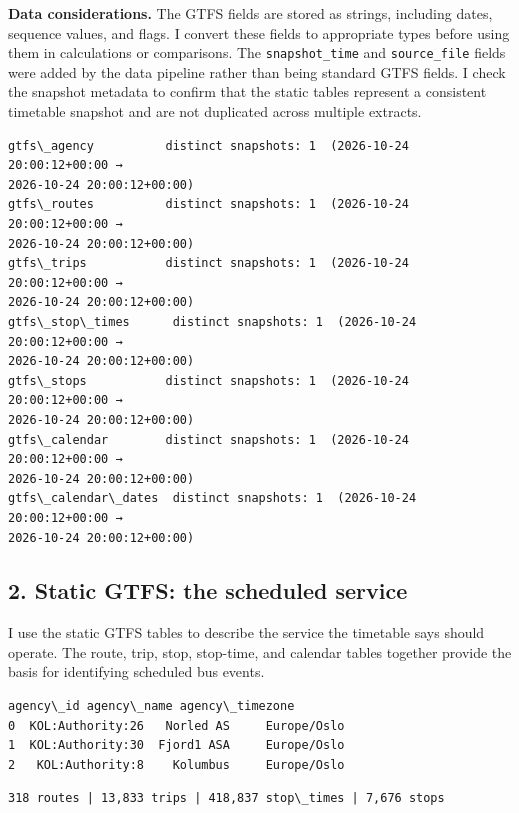\documentclass[11pt]{article}
\begin{document}
    \textbf{Data considerations.} The GTFS fields are stored as strings,
including dates, sequence values, and flags. I convert these fields to
appropriate types before using them in calculations or comparisons. The
\texttt{snapshot\_time} and \texttt{source\_file} fields were added by
the data pipeline rather than being standard GTFS fields. I check the
snapshot metadata to confirm that the static tables represent a
consistent timetable snapshot and are not duplicated across multiple
extracts.

    \begin{Verbatim}[commandchars=\\\{\}]
gtfs\_agency          distinct snapshots: 1  (2026-10-24 20:00:12+00:00 →
2026-10-24 20:00:12+00:00)
gtfs\_routes          distinct snapshots: 1  (2026-10-24 20:00:12+00:00 →
2026-10-24 20:00:12+00:00)
gtfs\_trips           distinct snapshots: 1  (2026-10-24 20:00:12+00:00 →
2026-10-24 20:00:12+00:00)
gtfs\_stop\_times      distinct snapshots: 1  (2026-10-24 20:00:12+00:00 →
2026-10-24 20:00:12+00:00)
gtfs\_stops           distinct snapshots: 1  (2026-10-24 20:00:12+00:00 →
2026-10-24 20:00:12+00:00)
gtfs\_calendar        distinct snapshots: 1  (2026-10-24 20:00:12+00:00 →
2026-10-24 20:00:12+00:00)
gtfs\_calendar\_dates  distinct snapshots: 1  (2026-10-24 20:00:12+00:00 →
2026-10-24 20:00:12+00:00)
    \end{Verbatim}

    \subsection{2. Static GTFS: the scheduled
service}\label{static-gtfs-the-scheduled-service}

I use the static GTFS tables to describe the service the timetable says
should operate. The route, trip, stop, stop-time, and calendar tables
together provide the basis for identifying scheduled bus events.

    
    \begin{Verbatim}[commandchars=\\\{\}]
          agency\_id agency\_name agency\_timezone
0  KOL:Authority:26   Norled AS     Europe/Oslo
1  KOL:Authority:30  Fjord1 ASA     Europe/Oslo
2   KOL:Authority:8    Kolumbus     Europe/Oslo
    \end{Verbatim}

    
    \begin{Verbatim}[commandchars=\\\{\}]
318 routes | 13,833 trips | 418,837 stop\_times | 7,676 stops
    \end{Verbatim}
\end{document}
